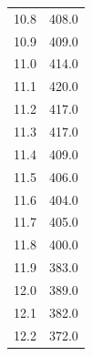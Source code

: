 \begin{minipage}{0.2\textwidth}
\begin{tabular}{S S}
  10.8	 & 	 408.0 \\
  10.9	 & 	 409.0 \\
  11.0	 & 	 414.0 \\
  11.1	 & 	 420.0 \\
  11.2	 & 	 417.0 \\
  11.3	 & 	 417.0 \\
  11.4	 & 	 409.0 \\
  11.5	 & 	 406.0 \\
  11.6	 & 	 404.0 \\
  11.7	 & 	 405.0 \\
  11.8	 & 	 400.0 \\
  11.9	 & 	 383.0 \\
  12.0	 & 	 389.0 \\
  12.1	 & 	 382.0 \\
  12.2	 & 	 372.0 \\
  \bottomrule
  \end{tabular}
  \end{minipage}
